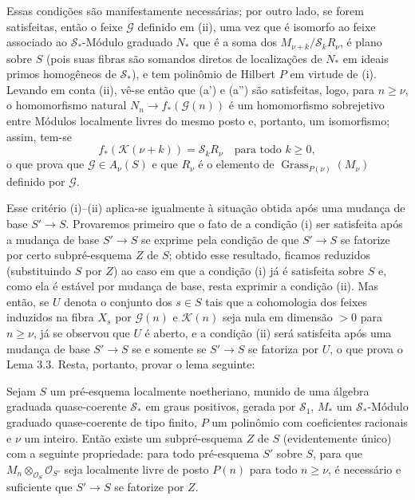 Essas condições são manifestamente necessárias; por outro lado, se forem
satisfeitas, então o feixe $\mathcal G$ definido em (ii), uma vez que é
isomorfo ao feixe associado ao $\mathcal S_*$-Módulo graduado $N_*$ que é a
soma dos $M_{\nu+k}/\mathcal S_kR_\nu$, é plano sobre $S$ (pois suas fibras
são somandos diretos de localizações de $N_*$ em ideais primos homogêneos de
$\mathcal S_*$), e tem polinômio de Hilbert $P$ em virtude de (i). Levando em
conta (ii), vê-se então que (a') e (a'') são satisfeitas, logo, para
$n\geq\nu$, o homomorfismo natural $N_n\longrightarrow f_*(\mathcal G(n))$ é
um homomorfismo sobrejetivo entre Módulos localmente livres do mesmo posto e,
portanto, um isomorfismo; assim, tem-se
\[
f_*(\mathcal K(\nu+k))=\mathcal S_kR_\nu
\quad\text{para todo $k\geq0$},
\]
o que prova que $\mathcal G\in A_\nu(S)$ e que $R_\nu$ é o elemento de
$\operatorname{Grass}_{P(\nu)}(M_\nu)$ definido por $\mathcal G$.

Esse critério (i)--(ii) aplica-se igualmente à situação obtida após uma
mudança de base $S'\longrightarrow S$. Provaremos primeiro que o fato de a
condição (i) ser satisfeita após a mudança de base $S'\longrightarrow S$ se
exprime pela condição de que $S'\longrightarrow S$ se fatorize por certo
subpré-esquema $Z$ de $S$; obtido esse resultado, ficamos reduzidos
(substituindo $S$ por $Z$) ao caso em que a condição (i) já é satisfeita sobre
$S$ e, como ela é estável por mudança de base, resta exprimir a condição (ii).
Mas então, se $U$ denota o conjunto dos $s\in S$ tais que a cohomologia dos
feixes induzidos na fibra $X_s$ por $\mathcal G(n)$ e $\mathcal K(n)$ seja nula
em dimensão $>0$ para $n\geq\nu$, já se observou que $U$ é aberto, e a condição
(ii) será satisfeita após uma mudança de base $S'\longrightarrow S$ se e somente
se $S'\longrightarrow S$ se fatoriza por $U$, o que prova o Lema 3.3. Resta,
portanto, provar o lema seguinte:

 Sejam $S$ um pré-esquema localmente noetheriano, munido de
uma álgebra graduada quase-coerente $\mathcal S_*$ em graus positivos, gerada
por $\mathcal S_1$, $M_*$ um $\mathcal S_*$-Módulo graduado quase-coerente de tipo
finito, $P$ um polinômio com coeficientes racionais e $\nu$ um inteiro. Então
existe um subpré-esquema $Z$ de $S$ (evidentemente único)
com a seguinte propriedade: para todo pré-esquema $S'$ sobre $S$, para que
$M_n\otimes_{\mathcal O_S}\mathcal O_{S'}$ seja localmente livre de posto
$P(n)$ para todo $n\geq\nu$, é necessário e suficiente que
$S'\longrightarrow S$ se fatorize por $Z$.


